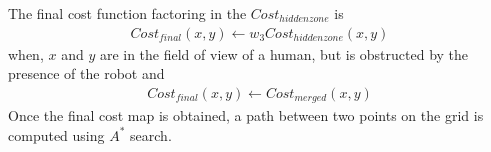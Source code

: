 The final cost function factoring in the $Cost_{hidden zone}$ is
\begin{align}
Cost_{final}(x,y) \leftarrow w_{3} Cost_{hidden zone}(x,y)
\end{align}
when, $x$ and $y$ are in the field of view of a human, but is obstructed by the presence of the robot and 
\begin{align}
Cost_{final}(x,y) \leftarrow Cost_{merged}(x,y)
\end{align}
Once the final cost map is obtained, a path between two points on the grid is computed using $A^*$ search. 

